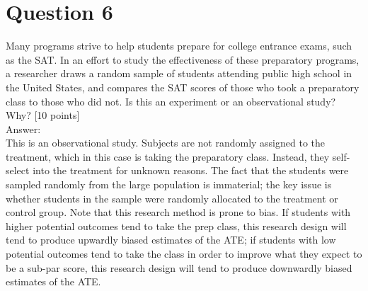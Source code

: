 \documentclass[11pt,notitlepage]{article}		%
\begin{document}
\section*{Question 6}
Many programs strive to help students prepare for college entrance exams, such as the SAT. In an effort to study the effectiveness of these preparatory programs, a researcher draws a random sample of students attending public high school in the United States, and compares the SAT scores of those who took a preparatory class to those who did not.  Is this an experiment or an observational study?  Why? [10 points]\\
Answer:\\
This is an observational study. Subjects are not randomly assigned to the treatment, which in this case is taking the preparatory class. Instead, they self-select into the treatment for unknown reasons. The fact that the students were sampled randomly from the large population is immaterial; the key issue is whether students in the sample were randomly allocated to the treatment or control group. Note that this research method is prone to bias. If students with higher potential outcomes tend to take the prep class, this research design will tend to produce upwardly biased estimates of the ATE; if students with low potential outcomes tend to take the class in order to improve what they expect to be a sub-par score, this research design will tend to produce downwardly biased estimates of the ATE.
\end{document}

